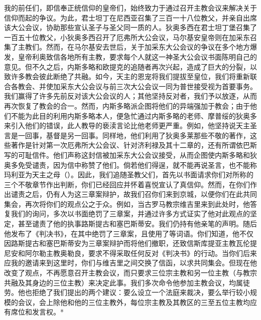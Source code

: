 我的前任们，即信奉正统信仰的皇帝们，始终致力于通过召开主教会议来解决关于信仰而起的争议。为此，君士坦丁在尼西亚召集了三百一十八位教父，并亲自出席该大公会议，协助那些宣认圣子与圣父同一质的人。狄奥多西在君士坦丁堡召集了一百五十位教父，小狄奥多西召开了厄弗所大公会议，马尔基安皇帝则在加采东召集了主教们。然而，在马尔基安去世后，关于加采东大公会议的争议在多个地方爆发，皇帝利奥致信各地所有主教，要求每个人就这一神圣大公会议书面陈明自己的意见。但不久之后，内斯多略和欧提克的追随者再次兴起，造成了巨大的分裂，以致许多教会彼此断绝了共融。如今，天主的恩宠将我们提拔至皇位，我们将重新联合各教会、并使加采东大公会议与前三次大公会议一同为普世接受视为首要事务。我们赢得了许多先前反对该大公会议的人；其他坚持反对者，我们予以放逐，从而再次恢复了教会的合一。然而，内斯多略派企图将他们的异端强加于教会；由于他们不能为此目的利用内斯多略本人，便急忙通过内斯多略的老师、摩普绥的狄奥多来引入他们的错误，此人教导的亵渎言论比他老师更严重。例如，他坚持说天主圣言是一回事，基督是另一回事。同样地，他们利用了狄奥多莱那些不敬的著作，这些著作是针对第一次厄弗所大公会议、针对济利禄及其十二章的，还有所谓依巴斯写的可耻信件。他们声称这封信被加采东大公会议接受，从而企图使内斯多略和狄奥多免受谴责，因为信中称赞了他们。倘若他们得逞，就不能再说圣言，也不能称玛利亚为天主之母（）。因此，我们追随圣教父们，首先以书面请求你们对所称的三个不敬章节作出判断，你们已经回应并怀着喜悦宣认了真信仰。然而，在你们作出谴责之后，仍有人为这三章案辩护，故我们召你们来到京城，以便你们在此共同集会，再次将你们的观点公之于众。例如，当古罗马教宗维吉里来到此处时，他答复我们的询问，多次以书面绝罚了三章案，并通过许多方式证实了他对此观点的坚定，甚至谴责了他的执事路斯提古和塞巴斯蒂安。我们仍持有他亲笔的声明。随后他发布了《判决书》，在其中绝罚了三章案，且使用了等词语。你们知道，他不仅因路斯提古和塞巴斯蒂安为三章案辩护而将他们撤职，还致信斯库提亚主教瓦伦提尼安和阿尔勒主教奥勒良，要求不得采取任何反对《判决书》的行动。当你们后来应我的邀请来到这里时，你们与维吉里之间交换了信函，以求共同集会。但现在他改变了观点，不再愿意召开主教会议，而只要求三位宗主教和另一位主教（与教宗共融及其身边的三位主教）来决定此事。我们多次命令他参加主教会议，均属徒劳。他也拒绝了我们提出的两个建议：要么设立一个法庭来裁决，要么举行较小规模的会议，会上除他和他的三位主教外，每位宗主教及其教区的三至五位主教均应有席位和发言权。* 